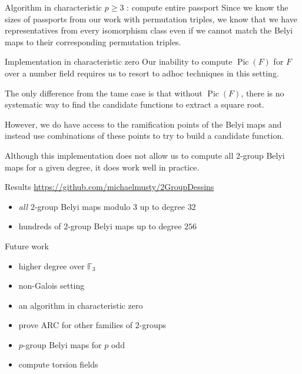\documentclass[xcolor=dvipsnames]{beamer}
\theoremstyle{plain}
\newcommand{\FF}{\mathbb{F}}
\DeclareMathOperator{\Pic}{Pic}
\begin{document}
{\begin{frame}{Algorithm in characteristic $p\geq 3$ : compute entire passport}
      Since we know the sizes of passports from our
      work with permutation triples,
      we know that we have representatives from
      every isomorphism class
      even if we cannot match the Belyi maps
      to their corresponding permutation triples.
    \end{frame}
    \begin{frame}{Implementation in characteristic zero}
      Our inability to compute $\Pic(F)$
      for $F$ over a number field requires
      us to resort to adhoc techniques in this setting.
      \pause\par
      The only difference from the tame case is that
      without $\Pic(F)$, there is no systematic way
      to find the candidate functions to extract
      a square root.
      \pause\par
      However, we do have access to the ramification points
      of the Belyi maps and instead use combinations
      of these points to try to build a candidate function.
      \pause\par
      Although this implementation does not allow us
      to compute all $2$-group Belyi maps for a given
      degree, it does work well in practice.
    \end{frame}
    \begin{frame}{Results}
        \url{https://github.com/michaelmusty/2GroupDessins}
      \begin{itemize}
        \item
          \emph{all} $2$-group Belyi maps modulo $3$ up to degree $32$
        \item
          hundreds of $2$-group Belyi maps up to degree $256$
      \end{itemize}
    \end{frame}
  }
  \begin{frame}{Future work}
    \begin{itemize}
      \item
        higher degree over $\FF_3$
      \item
        non-Galois setting
      \item
        an algorithm in characteristic zero
      \item
        prove ARC for other families of $2$-groups
      \item
        $p$-group Belyi maps for $p$ odd
      \item
        compute torsion fields
    \end{itemize}
  \end{frame}
\end{document}
